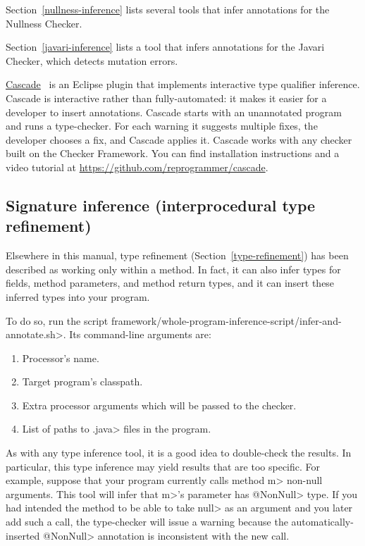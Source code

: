 Section~\ref{nullness-inference} lists several tools that infer
annotations for the Nullness Checker.

Section~\ref{javari-inference} lists a tool that infers
annotations for the Javari Checker, which detects mutation errors.

\href{https://github.com/reprogrammer/cascade/}{Cascade}~\cite{VakilianPEJ2014}
is an Eclipse plugin that implements interactive type qualifier inference.
Cascade is interactive rather than fully-automated:  it makes it easier for
a developer to insert annotations.
Cascade starts with an unannotated program and runs a type-checker.  For each
warning it suggests multiple fixes, the developer chooses a fix, and
Cascade applies it.  Cascade works with any checker built on the Checker
Framework.
You can find installation instructions and a video tutorial at \url{https://github.com/reprogrammer/cascade}.


\subsection{Signature inference (interprocedural type refinement)\label{jaif-inference}}

Elsewhere in this manual, type refinement (Section~\ref{type-refinement})
has been described as working only within a method.  In fact, it can also
infer types for fields, method parameters, and method return types, and it
can insert these inferred types into your program.

To do so, run the script
\<framework/whole-program-inference-script/infer-and-annotate.sh>.
Its command-line arguments are:

\begin{enumerate}
\item Processor's name.
\item Target program's classpath.
\item Extra processor arguments which will be passed to the checker.
\item List of paths to \<.java> files in the program.
\end{enumerate}


As with any type inference tool, it is a good idea to double-check the
results.  In particular, this type inference may yield results that are too
specific.  For example, suppose that your program currently calls
method \<m> non-null
arguments.  This tool will infer that \<m>'s parameter has
\<@NonNull> type.  If you had intended the method to be able to
take \<null> as an argument and you later add such a call, the type-checker
will issue a warning because the automatically-inserted \<@NonNull>
annotation is inconsistent with the new call.

